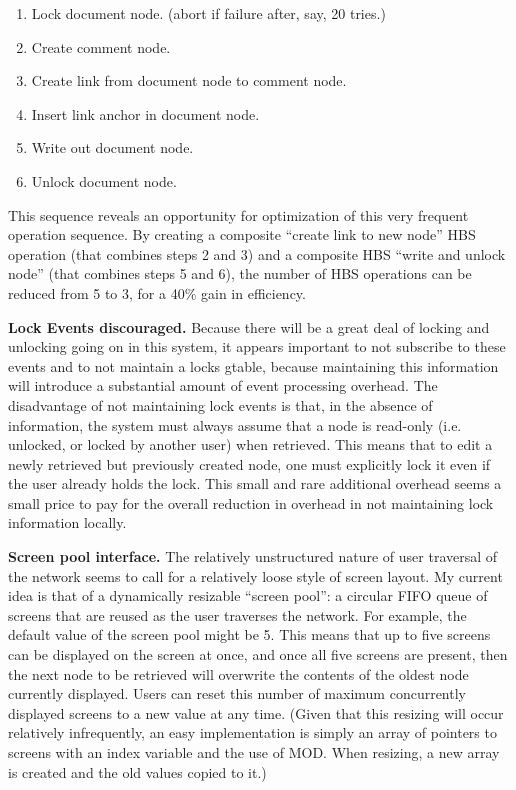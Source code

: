 \begin{itemizenoindent}
\begin{enumerate}
\item Lock document node. (abort if failure after, say, 20 tries.)
\item Create comment node.
\item Create link from document node to comment node.
\item Insert link anchor in document node.
\item Write out document node.
\item Unlock document node.
\end{enumerate}

This sequence reveals an opportunity for optimization of this very frequent
operation sequence.  By creating a composite ``create link to new node''
HBS operation (that combines steps 2 and 3) and a composite HBS ``write and unlock
node'' (that combines steps 5 and 6), the number of HBS operations can be
reduced from 5 to 3, for a 40\% gain in efficiency.

\item {\bf Lock Events discouraged.} Because there will be a great deal of
  locking and unlocking going on in this system, it appears important to not
  subscribe to these events and to not maintain a locks gtable, because
  maintaining this information will introduce a substantial amount of event
  processing overhead.  The disadvantage of not maintaining lock events is
  that, in the absence of information, the system must always assume that a
  node is read-only (i.e. unlocked, or locked by another user) when
  retrieved.  This means that to edit a newly retrieved but previously
  created node, one must explicitly lock it even if the user already holds
  the lock.  This small and rare additional overhead seems a small price to
  pay for the overall reduction in overhead in not maintaining lock
  information locally.
  
\item {\bf Screen pool interface.} The relatively unstructured nature of
  user traversal of the network seems to call for a relatively loose style of
  screen layout.  My current idea is that of a dynamically resizable ``screen
  pool'': a circular FIFO queue of screens that are reused as the user
  traverses the network. For example, the default value of the screen pool
  might be 5.  This means that up to five screens can be displayed on the
  screen at once, and once all five screens are present, then the next node
  to be retrieved will overwrite the contents of the oldest node currently
  displayed. Users can reset this number of maximum concurrently displayed
  screens to a new value at any time.  (Given that this resizing will occur
  relatively infrequently, an easy implementation is simply an array of
  pointers to screens with an index variable and the use of MOD. When
  resizing, a new array is created and the old values copied to it.)
  

\end{itemizenoindent}
